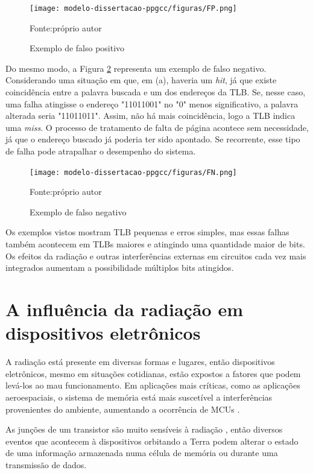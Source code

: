 \begin{figure}[ht]
    \centering
    \texttt{[image: modelo-dissertacao-ppgcc/figuras/FP.png]}
    \caption{Exemplo de falso positivo}{Fonte:próprio autor}
    \label{fig:fpex}
\end{figure}

Do mesmo modo, a Figura \ref{fig:fnex} representa um exemplo de falso negativo. Considerando uma situação em que, em (a), haveria um \textit{hit}, já que existe coincidência entre a palavra buscada e um dos endereços da TLB. Se, nesse caso, uma falha atingisse o endereço "11011001" no "0" menos significativo, a palavra alterada seria "11011011". Assim, não há mais coincidência, logo a TLB indica uma \textit{miss}. O processo de tratamento de falta de página acontece sem necessidade, já que o endereço buscado já poderia ter sido apontado. Se recorrente, esse tipo de falha pode atrapalhar o desempenho do sistema.

\begin{figure}[ht]
    \centering
    \texttt{[image: modelo-dissertacao-ppgcc/figuras/FN.png]}
    \caption{Exemplo de falso negativo}{Fonte:próprio autor}
    \label{fig:fnex}
\end{figure}

Os exemplos vistos mostram TLB pequenas e erros simples, mas essas falhas também acontecem em TLBs maiores e atingindo uma quantidade maior de bits. Os efeitos da radiação e outras interferências externas em circuitos cada vez mais integrados aumentam a possibilidade múltiplos bits atingidos.  

\section{A influência da radiação em dispositivos eletrônicos}

A radiação está presente em diversas formas e lugares, então dispositivos eletrônicos, mesmo em situações cotidianas, estão expostos a fatores que podem levá-los ao mau funcionamento. Em aplicações mais críticas, como as aplicações aeroespaciais, o sistema de memória está mais suscetível a interferências provenientes do ambiente, aumentando a ocorrência de MCUs \cite{varghese2013multiple}.

As junções de um transistor são muito sensíveis à radiação \cite{baumann2005soft}, então diversos eventos que acontecem à dispositivos orbitando a Terra podem alterar o estado de uma informação armazenada numa célula de memória ou durante uma transmissão de dados.

